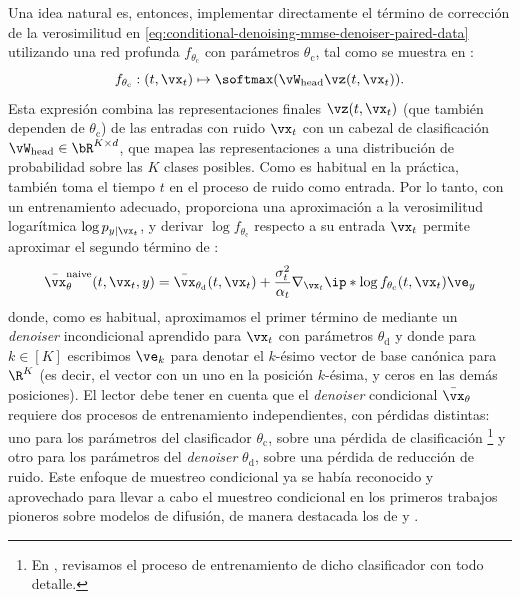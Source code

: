 \documentclass[../../book-main_es.tex]{subfiles}
\begin{document}
Una idea natural es, entonces, implementar directamente el término de corrección de la verosimilitud en
\eqref{eq:conditional-denoising-mmse-denoiser-paired-data} utilizando una red profunda
$f_{\theta_{\mathrm{c}}}$ con parámetros $\theta_{\mathrm{c}}$, tal como se muestra en
:
\begin{equation}
    f_{\theta_{\mathrm{c}}} : (t, \vx_t) \mapsto \softmax(\vW_{\mathrm{head}}
    \vz(t, \vx_t)).
\end{equation}
Esta expresión combina las representaciones finales $\vz(t, \vx_t)$
(que también dependen de
$\theta_{\mathrm{c}}$) de las entradas con ruido
$\vx_t$ con un cabezal de clasificación $\vW_{\mathrm{head}} \in \bR^{K
\times d}$, que mapea las
representaciones a una distribución de probabilidad sobre las $K$ clases posibles.
Como es habitual en la práctica, también toma el tiempo $t$ en el proceso de ruido como
entrada.
Por lo tanto, con un entrenamiento adecuado, proporciona una aproximación a la
verosimilitud logarítmica
$\log p_{y \mid \vx_t}$, y derivar $\log f_{\theta_{\mathrm{c}}}$
respecto a su entrada $\vx_t$
permite aproximar el segundo término de
:
\begin{equation}\label{eq:conditional-denoising-mmse-denoiser-paired-data-approx}
    \bar{\vx}_{\theta}^{\mathrm{naive}}(t, \vx_t, y)
    =
    \bar{\vx}_{\theta_{\mathrm{d}}}(t, \vx_t)
    + \frac{\sigma_t^2}{\alpha_t}
    \nabla_{\vx_t}
    \ip*{
        \log f_{\theta_{\mathrm{c}}}(t, \vx_t)
    }{
        \ve_{y}
    }
\end{equation}
donde, como es habitual, aproximamos el primer término de
 mediante un
\textit{denoiser} incondicional aprendido para $\vx_t$ con parámetros $\theta_{\mathrm{d}}$ y
donde para $k \in [K]$ escribimos $\ve_k$ para denotar el $k$-ésimo vector de base canónica
para $\R^K$ (es decir, el vector con
un uno en la posición $k$-ésima, y ceros en las demás posiciones).
El lector debe tener en cuenta que el \textit{denoiser} condicional $\bar{\vx}_{\theta}$
requiere dos procesos de entrenamiento independientes, con pérdidas distintas: uno para los
parámetros del clasificador $\theta_{\mathrm{c}}$, sobre una pérdida de clasificación
\footnote{En , revisamos el proceso de entrenamiento de dicho
clasificador con todo detalle.} y otro para los parámetros del \textit{denoiser} 
$\theta_{\mathrm{d}}$, sobre una pérdida de reducción de ruido. Este enfoque de muestreo condicional
ya se había reconocido y aprovechado para llevar a cabo el muestreo condicional en
los primeros trabajos pioneros sobre modelos de difusión, de manera destacada los de
\citet{Sohl-Dickstein2015} y \citet{song2020score}. 
\end{document}
